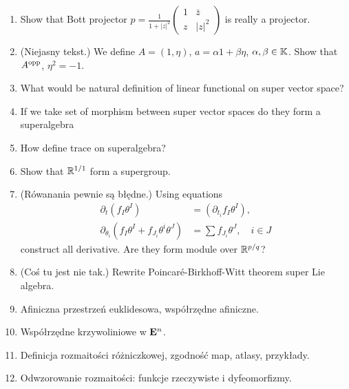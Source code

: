 \documentclass[a4paper,11pt]{article}
\begin{document}
\begin{enumerate}
\item Show that Bott projector
  $p = \frac{ 1 }{ 1 + \lvert z \rvert^{ 2 } }
  \begin{pmatrix}
    1 & \bar{z} \\
    z & \lvert z \lvert^{ 2 }
  \end{pmatrix}$ is really a projector.

\item (Niejasny tekst.) We define $A = ( 1, \eta )$,
  $a = \alpha 1 + \beta \eta$, $\alpha, \beta \in \mathbb{K}$. Show that
  $A^{ \textrm{opp} }$, $\eta^{ 2 } = -1$.

\item What would be natural definition of linear functional on super
  vector space?

\item If we take set of morphism between super vector spaces do they
  form a superalgebra

\item How define trace on superalgebra?

\item Show that $\mathbb{R}^{ 1 / 1 }$ form a supergroup.

\item (Rówanania pewnie są błędne.) Using equations
  \begin{align}
    \partial_{ t } \left( f_{ I } \theta^{ I } \right)
    &= \left( \partial_{ t_{ i } } f_{ I } \theta^{ I } \right), \\
    \partial_{ \theta_{ i } } \left( f_{ I } \theta^{ I }
    + f_{ J_{ i } } \theta^{ i } \theta^{ J } \right)
    &= \sum f_{ J_{ i } } \theta^{ J }, \quad
      i \in J
  \end{align}
  construct all derivative. Are they form module over
  $\mathbb{R}^{ p / q }$?

\item (Coś tu jest nie tak.) Rewrite Poincar\'{e}-Birkhoff-Witt
  theorem super Lie algebra.

\item Afiniczna przestrzeń euklidesowa, współrzędne afiniczne.

\item Współrzędne krzywoliniowe w $\mathbf{E}^{ n }$.

\item Definicja rozmaitości różniczkowej, zgodność map, atlasy,
  przykłady.

\item Odwzorowanie rozmaitości: funkcje rzeczywiste i dyfeomorfizmy.


\end{enumerate}
\end{document}
